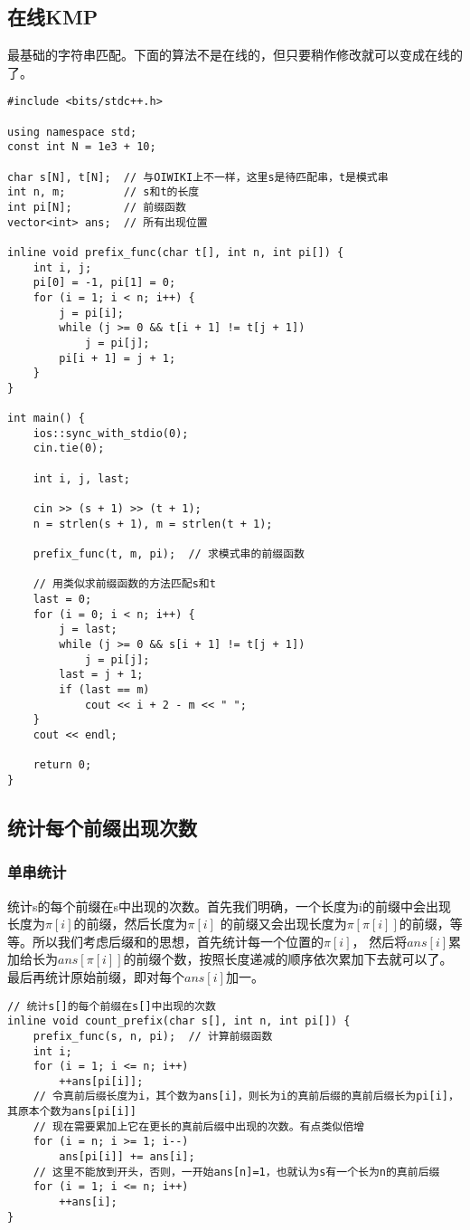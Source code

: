     \subsection{在线KMP}
        最基础的字符串匹配。下面的算法不是在线的，但只要稍作修改就可以变成在线的了。
        \begin{lstlisting}
#include <bits/stdc++.h>

using namespace std;
const int N = 1e3 + 10;

char s[N], t[N];  // 与OIWIKI上不一样，这里s是待匹配串，t是模式串
int n, m;         // s和t的长度
int pi[N];        // 前缀函数
vector<int> ans;  // 所有出现位置

inline void prefix_func(char t[], int n, int pi[]) {
    int i, j;
    pi[0] = -1, pi[1] = 0;
    for (i = 1; i < n; i++) {
        j = pi[i];
        while (j >= 0 && t[i + 1] != t[j + 1])
            j = pi[j];
        pi[i + 1] = j + 1;
    }
}

int main() {
    ios::sync_with_stdio(0);
    cin.tie(0);

    int i, j, last;

    cin >> (s + 1) >> (t + 1);
    n = strlen(s + 1), m = strlen(t + 1);

    prefix_func(t, m, pi);  // 求模式串的前缀函数

    // 用类似求前缀函数的方法匹配s和t
    last = 0;
    for (i = 0; i < n; i++) {
        j = last;
        while (j >= 0 && s[i + 1] != t[j + 1])
            j = pi[j];
        last = j + 1;
        if (last == m)
            cout << i + 2 - m << " ";
    }
    cout << endl;

    return 0;
}
        \end{lstlisting}
    \subsection{统计每个前缀出现次数}
        \subsubsection{单串统计}
            统计s的每个前缀在s中出现的次数。首先我们明确，一个长度为i的前缀中会出现长度为$\pi[i]$的前缀，然后长度为$\pi[i]$
            的前缀又会出现长度为$\pi[\pi[i]]$的前缀，等等。所以我们考虑后缀和的思想，首先统计每一个位置的$\pi[i]$，
            然后将$ans[i]$累加给长为$ans[\pi[i]]$的前缀个数，按照长度递减的顺序依次累加下去就可以了。
            最后再统计原始前缀，即对每个$ans[i]$加一。
            \begin{lstlisting}
// 统计s[]的每个前缀在s[]中出现的次数
inline void count_prefix(char s[], int n, int pi[]) {
    prefix_func(s, n, pi);  // 计算前缀函数
    int i;
    for (i = 1; i <= n; i++)
        ++ans[pi[i]];
    // 令真前后缀长度为i，其个数为ans[i]，则长为i的真前后缀的真前后缀长为pi[i]，其原本个数为ans[pi[i]]
    // 现在需要累加上它在更长的真前后缀中出现的次数。有点类似倍增
    for (i = n; i >= 1; i--)
        ans[pi[i]] += ans[i];
    // 这里不能放到开头，否则，一开始ans[n]=1，也就认为s有一个长为n的真前后缀
    for (i = 1; i <= n; i++)
        ++ans[i];
}
            \end{lstlisting}
